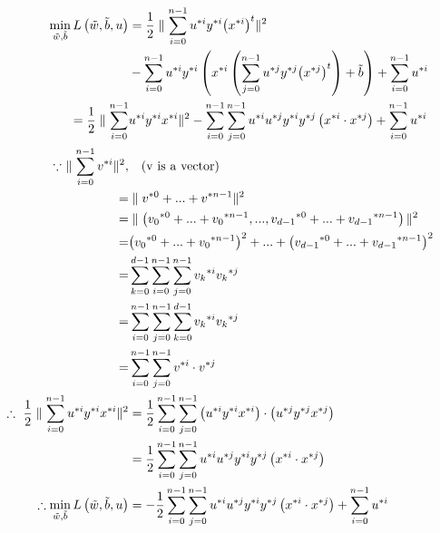 \documentclass[runningheads,openany]{xhlPaper}
\begin{document}
\begin{equation}
\label{equ:svmConvertedFromDual}
\begin{aligned}
\mathop {\min }\limits_{\tilde w,\tilde b} L\left( {\tilde w,\tilde b,u} \right) &= \frac{1}{2}\parallel \sum\limits_{i = 0}^{n - 1} {{u^{*i}}{y^{*i}}{{\left( {{x^{*i}}} \right)}^t}} {\parallel ^2} \\
&-\sum\limits_{i = 0}^{n - 1} {{u^{*i}}{y^{*i}}\left( {{x^{*i}}\left( {\sum\limits_{j = 0}^{n - 1} {{u^{*j}}{y^{*j}}{{\left( {{x^{*j}}} \right)}^t}} } \right) + \tilde b} \right)}  + \sum\limits_{i = 0}^{n - 1} {{u^{*i}}} \\
= \frac{1}{2}\parallel \sum\limits_{i = 0}^{n - 1} &{{u^{*i}}{y^{*i}}{x^{*i}}} {\parallel ^2} - \sum\limits_{i = 0}^{n - 1} {\sum\limits_{j = 0}^{n - 1} {{u^{*i}}{u^{*j}}{y^{*i}}{y^{*j}}\left( {{x^{*i}} \cdot {x^{*j}}} \right)} } + \sum\limits_{i = 0}^{n - 1} {{u^{*i}}} \\
\because\ \parallel \sum\limits_{i = 0}^{n - 1} {{v^{*i}}} {\parallel ^2},&\quad {\left(\rm{v\ is\ a\ vector}\right)}\\
 =& \parallel {v^{*0}} + ... + {v^{*n - 1}}{\parallel ^2}\\
 =& \parallel \left( {{v_0}^{*0} + ... + {v_0}^{*n - 1},...,{v_{d - 1}}^{*0} + ... + {v_{d - 1}}^{*n - 1}} \right){\parallel ^2}\\
 =& {\left( {{v_0}^{*0} + ... + {v_0}^{*n - 1}} \right)^2} + ... + {\left( {{v_{d - 1}}^{*0} + ... + {v_{d - 1}}^{*n - 1}} \right)^2}\\
 =& \sum\limits_{k = 0}^{d - 1} {\sum\limits_{i = 0}^{n - 1} {\sum\limits_{j = 0}^{n - 1} {{v_k}^{*i}{v_k}^{*j}} } } \\
 =& \sum\limits_{i = 0}^{n - 1} {\sum\limits_{j = 0}^{n - 1} {\sum\limits_{k = 0}^{d - 1} {{v_k}^{*i}{v_k}^{*j}} } } \\
 =& \sum\limits_{i = 0}^{n - 1} {\sum\limits_{j = 0}^{n - 1} {{v^{*i}} \cdot {v^{*j}}} } \\
\therefore\ \frac{1}{2}\parallel \sum\limits_{i = 0}^{n - 1} {{u^{*i}}{y^{*i}}{x^{*i}}} {\parallel ^2} &= \frac{1}{2}\sum\limits_{i = 0}^{n - 1} {\sum\limits_{j = 0}^{n - 1} {\left( {{u^{*i}}{y^{*i}}{x^{*i}}} \right) \cdot \left( {{u^{*j}}{y^{*j}}{x^{*j}}} \right)} } \\
 &= \frac{1}{2}\sum\limits_{i = 0}^{n - 1} {\sum\limits_{j = 0}^{n - 1} {{u^{*i}}{u^{*j}}{y^{*i}}{y^{*j}}\left( {{x^{*i}} \cdot {x^{*j}}} \right)} } \\
\therefore \mathop {\min }\limits_{\tilde w,\tilde b} L\left( {\tilde w,\tilde b,u} \right) &=  - \frac{1}{2}\sum\limits_{i = 0}^{n - 1} {\sum\limits_{j = 0}^{n - 1} {{u^{*i}}{u^{*j}}{y^{*i}}{y^{*j}}\left( {{x^{*i}} \cdot {x^{*j}}} \right)} }  + \sum\limits_{i = 0}^{n - 1} {{u^{*i}}} 
\end{aligned}
\end{equation}
\end{document}
